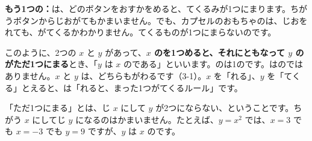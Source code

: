 \textbf{もう1つの：}\quad {}は、どのボタンをおすかをめると、てくるみが1つにまります。ちがうボタンからじおがてもかまいません。でも、カプセルのおもちゃのは、じおをれても、がてくるかわかりません。てくるものが1つにまらないのです。

このように、2つの $x$ と $y$ があって、\textbf{$x$ のを1つめると、それにともなって $y$ のがただ1つにまる}とき、「$y$ は $x$ の\textbf{}である」といいます。のは1のです。はのではありません。$x$ と $y$ は、どちらもがわるです（3-1）。$x$ を「れる」、$y$ を「てくる」とえると、は「れると、まった1つがてくるルール」です。

\begin{seikaku}
「ただ1つにまる」とは、じ $x$ にして $y$ が2つにならない、ということです。ちがう $x$ にしてじ $y$ になるのはかまいません。たとえば、$y=x^2$ では、$x=3$ でも $x=-3$ でも $y=9$ ですが、$y$ は $x$ のです。
\end{seikaku}

